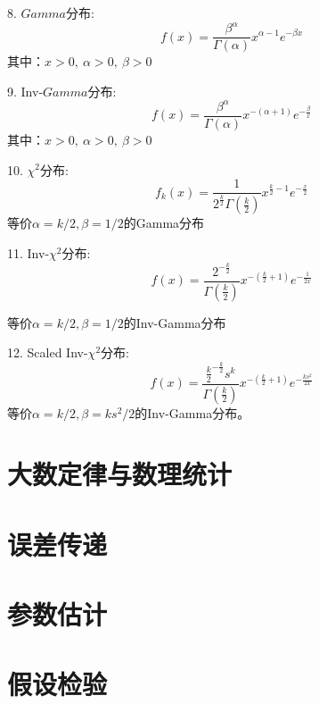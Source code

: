 8. $Gamma$分布: 
\begin{equation}
   f(x)=\frac{\beta^{\alpha}}{\Gamma(\alpha)} x^{\alpha-1} e^{-\beta x}
\end{equation}
   其中：$x>0,\ \alpha>0,\ \beta>0$

9. Inv-$Gamma$分布: 
\begin{equation}
    f(x)=\frac{\beta^{\alpha}}{\Gamma(\alpha)} x^{-(\alpha+1)} e^{-\frac{\beta}{x}}
\end{equation}
   其中：$x>0,\ \alpha>0,\ \beta>0$

10. $\chi ^2$分布: 
\begin{equation}
    f_{k}(x)=\frac{1}{2^{\frac{k}{2}} \Gamma\left(\frac{k}{2}\right)} x^{\frac{k}{2}-1} e^{-\frac{x}{2}}
\end{equation}
    等价$\alpha=k/2,\beta = 1/2$的Gamma分布

11. Inv-$\chi ^2$分布: 
\begin{equation}
    f(x)=\frac{2^{-\frac{k}{2}}}{\Gamma\left(\frac{k}{2}\right)} x^{-\left(\frac{k}{2}+1\right)} e^{-\frac{1}{2 x}}
\end{equation}
    
    等价$\alpha=k/2,\beta = 1/2$的Inv-Gamma分布

12. Scaled Inv-$\chi ^2$分布: 
   \begin{equation}
       f(x)=\frac{\frac{k}{2}^{-\frac{k}{2}} s^{k}}{\Gamma\left(\frac{k}{2}\right)} x^{-\left(\frac{k}{2}+1\right)} e^{-\frac{k s^{2}}{2 x}}
   \end{equation}
     等价$\alpha=k/2,\beta = ks^2/2$的Inv-Gamma分布。

\section{大数定律与数理统计}


\section{误差传递}

\section{参数估计}

\section{假设检验}